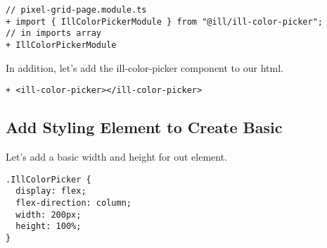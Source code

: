 \begin{lstlisting}
// pixel-grid-page.module.ts
+ import { IllColorPickerModule } from "@ill/ill-color-picker";
// in imports array
+ IllColorPickerModule
\end{lstlisting}

In addition, let's add the ill-color-picker component to our html.
\begin{lstlisting}
+ <ill-color-picker></ill-color-picker>
\end{lstlisting}

\subsection{ Add Styling Element to Create Basic  }
Let's add a basic width and height for out element.
\begin{lstlisting}
.IllColorPicker {
  display: flex;
  flex-direction: column;
  width: 200px;
  height: 100%;
}
\end{lstlisting}
